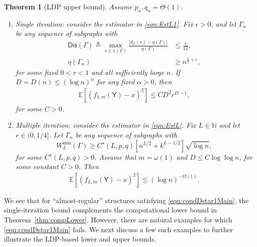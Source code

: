 \documentclass[12pt]{article}
\newcommand{\bE}{\mathbb{E}}
\newtheorem{theorem}{Theorem}
\newcommand{\pp}[1]{\left[#1\right]}
\newcommand{\s}[1]{\mathsf{#1}}
\begin{document}
\begin{theorem}[LDP upper bound]\label{thm:compUpper}
Assume $p_n,q_n=\Theta(1)$. 
\begin{enumerate}
    \item Single iteration: consider the estimator in \eqref{eqn:EstL1}. Fix $\epsilon>0$, and let $\Gamma_n$ be any sequence of subgraphs with
\begin{align}
\s{Dis}(\Gamma)\triangleq\max_{v\in v(\Gamma)} \frac{|d_\Gamma(v)-\eta(\Gamma)|}{\eta(\Gamma)}&\leq\frac{r}{12},\label{eqn:condDstar1Main}\\
\eta(\Gamma_n)&\geq n^{\frac12+\epsilon},\label{eqn:condDstar2Main}
\end{align}
for some fixed $0<r<1$ and all sufficiently large $n$. If $D=D(n)\leq (\log n)^{\alpha}$ for any fixed $\alpha>0$, then
\begin{align}
\bE\pp{(f_{1,m}(\s{Y})-x)^2}\leq CD^2r^{D-1},
\end{align}
for some $C>0$.

\item Multiple iteration: consider the estimator in \eqref{eqn:EstL}. Fix $L\in\mathbb{N}$ and let $r\in(0,1/4]$. Let $\Gamma_n$ be any sequence of subgraphs with
\begin{equation}
W_L^{\min}(\Gamma)\geq C^\star(L,p,q)\pp{n^{L/2}+k^{L-1/2}}\sqrt{\log n},\label{eqn:condDstar3Main}
\end{equation}
for some $C^\star(L,p,q)>0$. Assume that $m=\omega(1)$ and $D\le C\log\log n$, for some constant $C>0$. Then
\begin{align}
\bE\pp{(f_{L,m}(\s{Y})-x)^2}\leq (\log n)^{-\Omega(1)}.
\end{align}
\end{enumerate}
\end{theorem}

We see that for ``almost-regular'' structures satisfying \eqref{eqn:condDstar1Main}, the single-iteration bound complements the computational lower bound in Theorem~\ref{thm:compLower}. However, there are natural examples for which \eqref{eqn:condDstar1Main} fails. We next discuss a few such examples to further illustrate the LDP-based lower and upper bounds.
\end{document}
